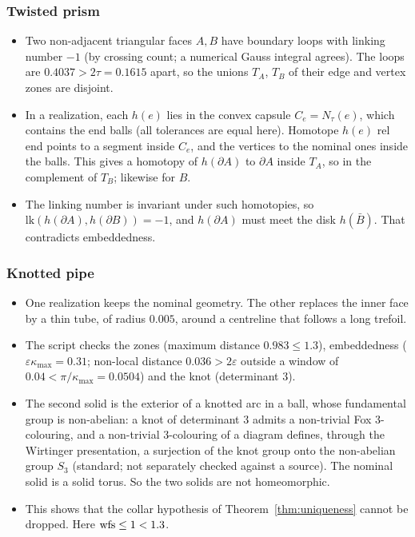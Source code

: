 \subsubsection*{Twisted prism}
\begin{itemize}
\item Two non-adjacent triangular faces $A,B$ have boundary loops with linking number $-1$ (by crossing count; a
numerical Gauss integral agrees). The loops are $0.4037>2\tau=0.1615$ apart, so the unions $T_A$, $T_B$ of
their edge and vertex zones are disjoint.
\item In a realization, each $h(e)$ lies in the convex capsule $C_e=N_\tau(e)$, which contains the end balls (all
tolerances are equal here). Homotope $h(e)$ rel end points to a segment inside $C_e$, and the vertices to the
nominal ones inside the balls. This gives a homotopy of $h(\partial A)$ to $\partial A$ inside $T_A$, so in the
complement of $T_B$; likewise for $B$.
\item The linking number is invariant under such homotopies, so $\mathrm{lk}(h(\partial A),h(\partial B))=-1$, and
$h(\partial A)$ must meet the disk $h(\bar B)$. That contradicts embeddedness.
\end{itemize}

\subsubsection*{Knotted pipe}
\begin{itemize}
\item One realization keeps the nominal geometry. The other replaces the inner face by a thin tube, of radius
$0.005$, around a centreline that follows a long trefoil.
\item The script checks the zones (maximum distance $0.983\le1.3$), embeddedness ($\varepsilon\kappa_{\max}=0.31$;
non-local distance $0.036>2\varepsilon$ outside a window of $0.04<\pi/\kappa_{\max}=0.0504$) and the knot
(determinant $3$).
\item The second solid is the exterior of a knotted arc in a ball, whose
fundamental group is non-abelian: a knot of determinant $3$ admits a non-trivial Fox $3$-colouring, and a
non-trivial $3$-colouring of a diagram defines, through the Wirtinger presentation, a surjection of the knot group onto
the non-abelian group $S_3$ (standard; not separately checked against a source). The nominal
solid is a solid torus. So the two solids are not homeomorphic.
\item This shows that the collar hypothesis of Theorem~\ref{thm:uniqueness} cannot be dropped. Here
$\operatorname{wfs}\le1<1.3$.
\end{itemize}

